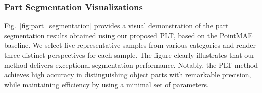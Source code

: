 

\subsubsection{Part Segmentation Visualizations}  
Fig.~\ref{fig:part_segmentation} provides a visual demonstration of the part segmentation results obtained using our proposed PLT, based on the PointMAE baseline. We select five representative samples from various categories and render three distinct perspectives for each sample. The figure clearly illustrates that our method delivers exceptional segmentation performance. Notably, the PLT method achieves high accuracy in distinguishing object parts with remarkable precision, while maintaining efficiency by using a minimal set of parameters.

